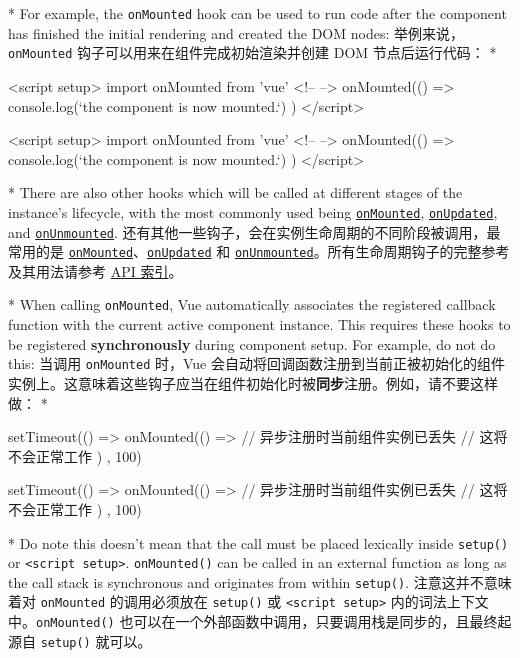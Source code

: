 \begin{paracol}{2}
\switchcolumn[0]*%
For example, the \texttt{onMounted} hook can be used to run code after
the component has finished the initial rendering and created the DOM
nodes:
\switchcolumn
举例来说，\texttt{onMounted} 钩子可以用来在组件完成初始渲染并创建 DOM
节点后运行代码：
\switchcolumn[0]*%
\begin{codeHtml}
<script setup>
import { onMounted } from 'vue'
<!-- -->
onMounted(() => {
  console.log(`the component is now mounted.`)
})
</script>
\end{codeHtml}
\switchcolumn
\begin{codeHtml}
<script setup>
import { onMounted } from 'vue'
<!-- -->
onMounted(() => {
  console.log(`the component is now mounted.`)
})
</script>
\end{codeHtml}
\switchcolumn[0]*%
There are also other hooks which will be called at different stages of
the instance's lifecycle, with the most commonly used being
\href{https://vuejs.org/api/composition-api-lifecycle.html\#onmounted}{\texttt{onMounted}},
\href{https://vuejs.org/api/composition-api-lifecycle.html\#onupdated}{\texttt{onUpdated}},
and
\href{https://vuejs.org/api/composition-api-lifecycle.html\#onunmounted}{\texttt{onUnmounted}}.
\switchcolumn
还有其他一些钩子，会在实例生命周期的不同阶段被调用，最常用的是
\href{https://cn.vuejs.org/api/composition-api-lifecycle.html\#onmounted}{\texttt{onMounted}}、\href{https://cn.vuejs.org/api/composition-api-lifecycle.html\#onupdated}{\texttt{onUpdated}}
和
\href{https://cn.vuejs.org/api/composition-api-lifecycle.html\#onunmounted}{\texttt{onUnmounted}}。所有生命周期钩子的完整参考及其用法请参考
\href{https://cn.vuejs.org/api/composition-api-lifecycle.html}{API
索引}。


\switchcolumn[0]*%
When calling \texttt{onMounted}, Vue automatically associates the
registered callback function with the current active component instance.
This requires these hooks to be registered \textbf{synchronously} during
component setup. For example, do not do this:
\switchcolumn
当调用 \texttt{onMounted} 时，Vue
会自动将回调函数注册到当前正被初始化的组件实例上。这意味着这些钩子应当在组件初始化时被\textbf{同步}注册。例如，请不要这样做：
\switchcolumn[0]*%
\begin{codeJs}
setTimeout(() => {
  onMounted(() => {
    // 异步注册时当前组件实例已丢失
    // 这将不会正常工作
  })
}, 100)
\end{codeJs}
\switchcolumn
\begin{codeJs}
setTimeout(() => {
  onMounted(() => {
    // 异步注册时当前组件实例已丢失
    // 这将不会正常工作
  })
}, 100)
\end{codeJs}
\switchcolumn[0]*%
Do note this doesn't mean that the call must be placed lexically inside
\texttt{setup()} or \texttt{\textless{}script\ setup\textgreater{}}.
\texttt{onMounted()} can be called in an external function as long as
the call stack is synchronous and originates from within
\texttt{setup()}.
\switchcolumn
注意这并不意味着对 \texttt{onMounted} 的调用必须放在 \texttt{setup()} 或
\texttt{\textless{}script\ setup\textgreater{}}
内的词法上下文中。\texttt{onMounted()}
也可以在一个外部函数中调用，只要调用栈是同步的，且最终起源自
\texttt{setup()} 就可以。



\end{paracol}
